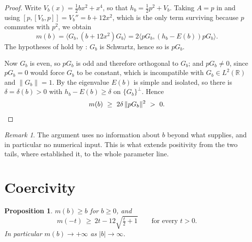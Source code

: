 \documentclass[11pt,reqno]{amsart}
\theoremstyle{plain}
\newtheorem{proposition}[theorem]{Proposition}
\theoremstyle{definition}
\theoremstyle{remark}
\newtheorem{remark}[theorem]{Remark}
\numberwithin{equation}{section}
\begin{document}
\begin{proof}
  Write $V_b(x)=\tfrac12bx^2+x^4$, so that $h_b=\tfrac12p^2+V_b$. Taking
  $A=p$ in  and using $[p,[V_b,p]]=V_b''=b+12x^2$, which is the
  only term surviving because $p$ commutes with $p^2$, we obtain
  \begin{equation}
    \label{eq:m-as-form}
    m(b)=\langle G_b,(b+12x^2)G_b\rangle
        =2\langle pG_b,(h_b-E(b))pG_b\rangle .
  \end{equation}
  The hypotheses of  hold by : $G_b$ is
  Schwartz, hence so is $pG_b$.

  Now $G_b$ is even, so $pG_b$ is odd and therefore orthogonal to $G_b$; and
  $pG_b\neq0$, since $pG_b=0$ would force $G_b$ to be constant, which is
  incompatible with $G_b\in L^2(\mathbb R)$ and $\|G_b\|=1$. By
   the eigenvalue $E(b)$ is simple and isolated, so there is
  $\delta=\delta(b)>0$ with $h_b-E(b)\ge\delta$ on $\{G_b\}^\perp$. Hence
  \begin{equation*}
    m(b)\ \ge\ 2\delta\,\|pG_b\|^2\ >\ 0. \qedhere
  \end{equation*}
\end{proof}

\begin{remark}
  The argument uses no information about $b$ beyond what
   supplies, and in particular no numerical input. This is
  what extends positivity from the two tails, where
  \cite{baez1992renormalized} established it, to the whole parameter line.
\end{remark}

\section{Coercivity}
\label{sec:coercivity}

\begin{proposition}
  \label{prop:coercivity}
  $m(b)\ge b$ for $b\ge0$, and
  \begin{equation}
    \label{eq:tail}
    m(-t)\ \ge\ 2t-12\sqrt{\tfrac t2+1}
    \qquad\text{for every }t>0 .
  \end{equation}
  In particular $m(b)\to+\infty$ as $|b|\to\infty$.
\end{proposition}
\end{document}
